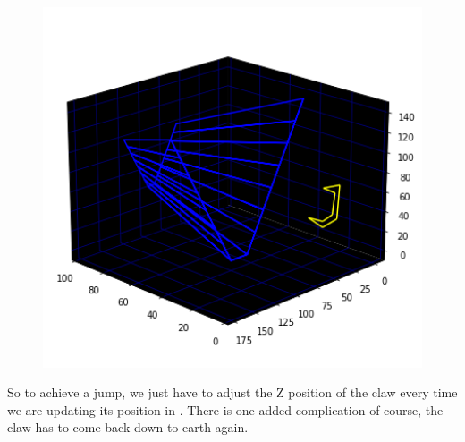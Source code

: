 \begin{minipage}[c]{0.31\linewidth}
\begin{figure}[H]
    \centering
    \begin{adjustbox}{width=5.5cm,center}
      \includegraphics[width=12cm]{src/jump/web_1.png}%
    \end{adjustbox}
\end{figure}
\end{minipage}

So to achieve a jump, we just have to adjust the Z position of the claw every time we
are updating its position in . There is one added complication of course,
the claw has to come back down to earth again.

